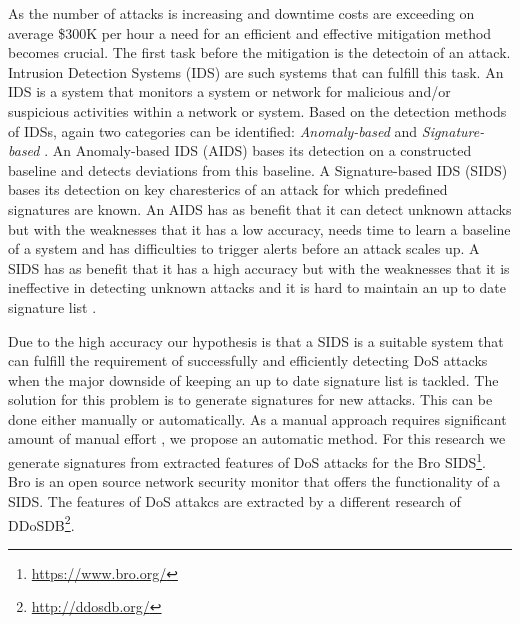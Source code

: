 As the number of attacks is increasing and downtime costs are exceeding on average \$300K per hour \cite{ITIC2016} a need for an efficient and effective mitigation method becomes crucial. The first task before the mitigation is the detectoin of an attack. Intrusion Detection Systems (IDS) are such systems that can fulfill this task. An IDS is a system that monitors a system or network for malicious and/or suspicious activities within a network or system. 
Based on the detection methods of IDSs, again two categories can be identified: \textit{Anomaly-based} and \textit{Signature-based} \cite{fragkiadakis2015anomaly}. An Anomaly-based IDS (AIDS) bases its detection on a constructed baseline and detects deviations from this baseline. A Signature-based IDS (SIDS) bases its detection on key charesterics of an attack for which predefined signatures are known. An AIDS has as benefit that it can detect unknown attacks but with the weaknesses that it has a low accuracy, needs time to learn a baseline of a system and has difficulties to trigger alerts before an attack scales up. A SIDS has as benefit that it has a high accuracy but with the weaknesses that it is ineffective in detecting unknown attacks and it is hard to maintain an up to date signature list \cite{Liao2013}. 

Due to the high accuracy our hypothesis is that a SIDS is a suitable system that can fulfill the requirement of successfully and efficiently detecting DoS attacks when the major downside of keeping an up to date signature list is tackled. The solution for this problem is to generate signatures for new attacks. This can be done either manually or automatically. As a manual approach requires significant amount of manual effort \cite{Lin2013}, we propose an automatic method. For this research we generate signatures from extracted features of DoS attacks for the Bro SIDS\footnote{\url{https://www.bro.org/}}. Bro is an open source network security monitor that offers the functionality of a SIDS. The features of DoS attakcs are extracted by a different research of DDoSDB\footnote{\url{http://ddosdb.org/}}.




